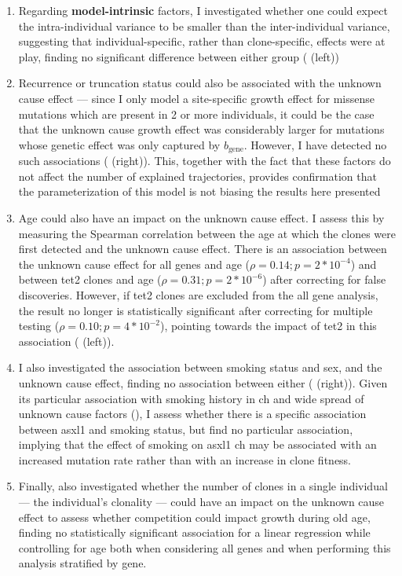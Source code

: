 \begin{enumerate}
    \item Regarding \textbf{model-intrinsic} factors, I investigated whether one could expect the intra-individual variance to be smaller than the inter-individual variance, suggesting that individual-specific, rather than clone-specific, effects were at play, finding no significant difference between either group ( (left))

	\item Recurrence or truncation status could also be associated with the unknown cause effect --- since I only model a site-specific growth effect for missense mutations which are present in 2 or more individuals, it could be the case that the unknown cause growth effect was considerably larger for mutations whose genetic effect was only captured by $b_{\mathrm{gene}}$. However, I have detected no such associations ( (right)). This, together with the fact that these factors do not affect the number of explained trajectories, provides confirmation that the parameterization of this model is not biasing the results here presented
	
    \item Age could also have an impact on the unknown cause effect. I assess this by measuring the Spearman correlation between the age at which the clones were first detected and the unknown cause effect. There is an association between the unknown cause effect for all genes and age ($\rho = 0.14; p = 2*10^{-4}$) and between \ac{tet2} clones and age ($\rho = 0.31; p = 2*10^{-6}$) after correcting for false discoveries. However, if \ac{tet2} clones are excluded from the all gene analysis, the result no longer is statistically significant after correcting for multiple testing ($\rho = 0.10; p = 4*10^{-2}$), pointing towards the impact of \ac{tet2} in this association ( (left)). 
	
	\item I also investigated the association between smoking status and sex, and the unknown cause effect, finding no association between either ( (right)). Given its particular association with smoking history in \ac{ch} \cite{Dawoud2020-af} and wide spread of unknown cause factors (), I assess whether there is a specific association between \ac{asxl1} and smoking status, but find no particular association, implying that the effect of smoking on \ac{asxl1} \ac{ch} may be associated with an increased mutation rate rather than with an increase in clone fitness. 
	
	\item Finally, also investigated whether the number of clones in a single individual --- the individual's clonality --- could have an impact on the unknown cause effect to assess whether competition could impact growth during old age, finding no statistically significant association for a linear regression while controlling for age both when considering all genes and when performing this analysis stratified by gene.
\end{enumerate}

